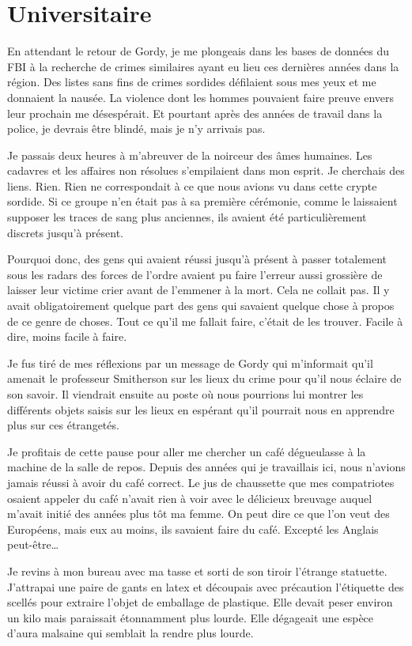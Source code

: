 \chapter[Universitaire]{Universitaire}
En attendant le retour de Gordy, je me plongeais dans les bases de données du FBI à la recherche de crimes similaires
ayant eu lieu ces dernières années dans la région. Des listes sans fins de crimes sordides défilaient sous mes yeux et
me donnaient la nausée. La violence dont les hommes pouvaient faire preuve envers leur prochain me désespérait. Et 
pourtant après des années de travail dans la police, je devrais être blindé, mais je n'y arrivais pas.

Je passais deux heures à m'abreuver de la noirceur des âmes humaines. Les cadavres et les affaires non résolues
s'empilaient dans mon esprit. Je cherchais des liens. Rien. Rien ne correspondait à ce que nous avions vu dans cette
crypte sordide. Si ce groupe n'en était pas à sa première cérémonie, comme le laissaient supposer les traces de sang
plus anciennes, ils avaient été particulièrement discrets jusqu'à présent.

Pourquoi donc, des gens qui avaient réussi jusqu'à présent à passer totalement sous les radars des forces de l'ordre
avaient pu faire l'erreur aussi grossière de laisser leur victime crier avant de l'emmener à la mort. Cela ne collait
pas. Il y avait obligatoirement quelque part des gens qui savaient quelque chose à propos de ce genre de choses. Tout 
ce qu'il me fallait faire, c'était de les trouver. Facile à dire, moins facile à faire.

Je fus tiré de mes réflexions par un message de Gordy qui m'informait qu'il amenait le professeur Smitherson sur les
lieux du crime pour qu'il nous éclaire de son savoir. Il viendrait ensuite au poste où nous pourrions lui montrer
les différents objets saisis sur les lieux en espérant qu'il pourrait nous en apprendre plus sur ces étrangetés.

Je profitais de cette pause pour aller me chercher un café dégueulasse à la machine de la salle de repos. Depuis des
années qui je travaillais ici, nous n'avions jamais réussi à avoir du café correct. Le jus de chaussette que mes
compatriotes osaient appeler du café n'avait rien à voir avec le délicieux breuvage auquel m'avait initié des années
plus tôt ma femme. On peut dire ce que l'on veut des Européens, mais eux au moins, ils savaient faire du café. Excepté
les Anglais peut-être\ldots{}

Je revins à mon bureau avec ma tasse et sorti de son tiroir l'étrange statuette. J'attrapai une paire de gants en latex
et découpais avec précaution l'étiquette des scellés pour extraire l'objet de emballage de plastique. Elle devait peser
environ un kilo mais paraissait étonnamment plus lourde. Elle dégageait une espèce d'aura malsaine qui semblait la
rendre plus lourde.

